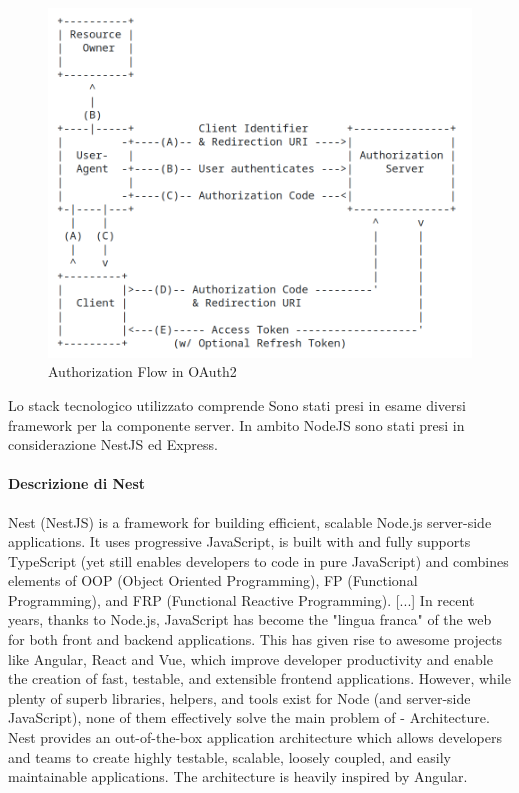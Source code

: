 \documentclass[a4paper,11pt]{article}
\begin{document}
\begin{figure}[H]
  \includegraphics[width=1\linewidth]{img/image-1.png}
  \caption{Authorization Flow in OAuth2 \cite{ietf6749OAuth}}
  \label{fig:authorizationoauth2}
\end{figure}

Lo stack tecnologico utilizzato comprende
Sono stati presi in esame diversi framework per la componente server. In ambito NodeJS sono stati presi in considerazione NestJS ed Express.

\paragraph{Descrizione di Nest}
Nest (NestJS) is a framework for building efficient, scalable Node.js server-side applications. It uses progressive JavaScript, is built with and fully supports TypeScript (yet still enables developers to code in pure JavaScript) and combines elements of OOP (Object Oriented Programming), FP (Functional Programming), and FRP (Functional Reactive Programming). [...] In recent years, thanks to Node.js, JavaScript has become the "lingua franca" of the web for both front and backend applications. This has given rise to awesome projects like Angular, React and Vue, which improve developer productivity and enable the creation of fast, testable, and extensible frontend applications. However, while plenty of superb libraries, helpers, and tools exist for Node (and server-side JavaScript), none of them effectively solve the main problem of - Architecture. Nest provides an out-of-the-box application architecture which allows developers and teams to create highly testable, scalable, loosely coupled, and easily maintainable applications. The architecture is heavily inspired by Angular. \cite{nestjsDocumentationNestJS}
\end{document}
